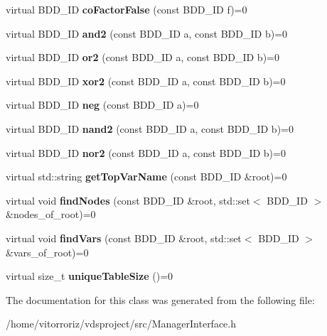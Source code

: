 \begin{DoxyCompactItemize}
\item 
virtual B\+D\+D\+\_\+\+ID {\bfseries co\+Factor\+False} (const B\+D\+D\+\_\+\+ID f)=0\label{classClassProject_1_1ManagerInterface_a308c99661ad02f407d6f2b0af6230e80}

\item 
virtual B\+D\+D\+\_\+\+ID {\bfseries and2} (const B\+D\+D\+\_\+\+ID a, const B\+D\+D\+\_\+\+ID b)=0\label{classClassProject_1_1ManagerInterface_af914326d34a1ed42710f7b11e5baf010}

\item 
virtual B\+D\+D\+\_\+\+ID {\bfseries or2} (const B\+D\+D\+\_\+\+ID a, const B\+D\+D\+\_\+\+ID b)=0\label{classClassProject_1_1ManagerInterface_a8dbfde761b1e94d1f222b4d27f3c6fbc}

\item 
virtual B\+D\+D\+\_\+\+ID {\bfseries xor2} (const B\+D\+D\+\_\+\+ID a, const B\+D\+D\+\_\+\+ID b)=0\label{classClassProject_1_1ManagerInterface_a2b2c4948ef41ddb1036289cd07dac156}

\item 
virtual B\+D\+D\+\_\+\+ID {\bfseries neg} (const B\+D\+D\+\_\+\+ID a)=0\label{classClassProject_1_1ManagerInterface_a57d34af3121dcf5366d22ecf792f05a0}

\item 
virtual B\+D\+D\+\_\+\+ID {\bfseries nand2} (const B\+D\+D\+\_\+\+ID a, const B\+D\+D\+\_\+\+ID b)=0\label{classClassProject_1_1ManagerInterface_aaf6e357d680613e449d3ea958c9abba1}

\item 
virtual B\+D\+D\+\_\+\+ID {\bfseries nor2} (const B\+D\+D\+\_\+\+ID a, const B\+D\+D\+\_\+\+ID b)=0\label{classClassProject_1_1ManagerInterface_a312d9865eae2d6355e17855cba78bc78}

\item 
virtual std\+::string {\bfseries get\+Top\+Var\+Name} (const B\+D\+D\+\_\+\+ID \&root)=0\label{classClassProject_1_1ManagerInterface_afde45b2065361dfa6e61c1c7bc3fc1b4}

\item 
virtual void {\bfseries find\+Nodes} (const B\+D\+D\+\_\+\+ID \&root, std\+::set$<$ B\+D\+D\+\_\+\+ID $>$ \&nodes\+\_\+of\+\_\+root)=0\label{classClassProject_1_1ManagerInterface_ab460e331ffdb85d4128574b3aae72c1e}

\item 
virtual void {\bfseries find\+Vars} (const B\+D\+D\+\_\+\+ID \&root, std\+::set$<$ B\+D\+D\+\_\+\+ID $>$ \&vars\+\_\+of\+\_\+root)=0\label{classClassProject_1_1ManagerInterface_ab94feabca2125d334e542e502ae0186d}

\item 
virtual size\+\_\+t {\bfseries unique\+Table\+Size} ()=0\label{classClassProject_1_1ManagerInterface_a85cac80444b26e5b80eb96b9f1231c0e}

\end{DoxyCompactItemize}


The documentation for this class was generated from the following file\+:\begin{DoxyCompactItemize}
\item 
/home/vitorroriz/vdsproject/src/Manager\+Interface.\+h\end{DoxyCompactItemize}

